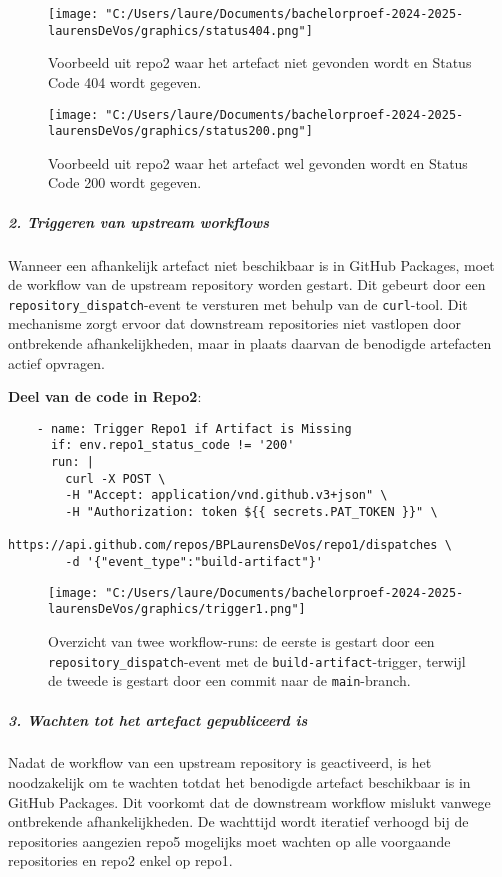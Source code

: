 \begin{figure}[h!]
    \centering
    \texttt{[image: "C:/Users/laure/Documents/bachelorproef-2024-2025-laurensDeVos/graphics/status404.png"]}
    \caption{Voorbeeld uit repo2 waar het artefact niet gevonden wordt en Status Code 404 wordt gegeven. }
\end{figure}

\begin{figure}[h!]
    \centering
    \texttt{[image: "C:/Users/laure/Documents/bachelorproef-2024-2025-laurensDeVos/graphics/status200.png"]}
    \caption{Voorbeeld uit repo2 waar het artefact wel gevonden wordt en Status Code 200 wordt gegeven. }
\end{figure}

\subparagraph{2. Triggeren van upstream workflows}
Wanneer een afhankelijk artefact niet beschikbaar is in GitHub Packages, moet de workflow van de upstream repository worden gestart. Dit gebeurt door een \texttt{repository\_dispatch}-event te versturen met behulp van de \texttt{curl}-tool. Dit mechanisme zorgt ervoor dat downstream repositories niet vastlopen door ontbrekende afhankelijkheden, maar in plaats daarvan de benodigde artefacten actief opvragen.

\textbf{Deel van de code in Repo2}:

\begin{verbatim}
    - name: Trigger Repo1 if Artifact is Missing
      if: env.repo1_status_code != '200'
      run: |
        curl -X POST \
        -H "Accept: application/vnd.github.v3+json" \
        -H "Authorization: token ${{ secrets.PAT_TOKEN }}" \
           https://api.github.com/repos/BPLaurensDeVos/repo1/dispatches \
        -d '{"event_type":"build-artifact"}'
\end{verbatim}

\begin{figure}[h!]
    \centering
    \texttt{[image: "C:/Users/laure/Documents/bachelorproef-2024-2025-laurensDeVos/graphics/trigger1.png"]}
    \caption{Overzicht van twee workflow-runs: de eerste is gestart door een \texttt{repository\_dispatch}-event met de \texttt{build-artifact}-trigger, terwijl de tweede is gestart door een commit naar de \texttt{main}-branch.}
\end{figure}

\subparagraph{3. Wachten tot het artefact gepubliceerd is}
Nadat de workflow van een upstream repository is geactiveerd, is het noodzakelijk om te wachten totdat het benodigde artefact beschikbaar is in GitHub Packages. Dit voorkomt dat de downstream workflow mislukt vanwege ontbrekende afhankelijkheden. De wachttijd wordt iteratief verhoogd bij de repositories aangezien repo5 mogelijks moet wachten op alle voorgaande repositories en repo2 enkel op repo1.

